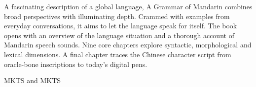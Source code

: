 
A fascinating description of a global language, {\mktsStyleItalic{}A Grammar of Mandarin\/} combines broad perspectives with illuminating depth. Crammed with examples from everyday conversations, it aims to let the language speak for itself. The book opens with an overview of the language situation and a thorough account of Mandarin speech sounds. Nine core chapters explore syntactic, morphological and lexical dimensions. A final chapter traces the Chinese character script from oracle-bone inscriptions to today’s digital pens.\mktsShowpar\par
\begin{multicols}{2}






\mktsShowpar\par
\mktsShowpar\par
{\mktsStyleBold{}MKTS} and {\mktsStyleBold{}MKTS}\mktsShowpar\par
\end{multicols}
